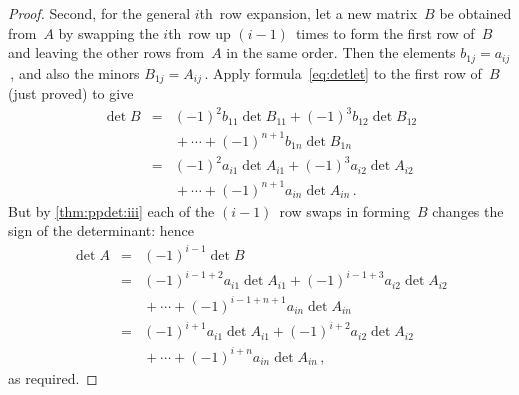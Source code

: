 \begin{proof}
Second, for the general \(i\)th~row expansion, let a new matrix~\(B\) be obtained from~\(A\) by swapping the \(i\)th~row up \((i-1)\)~times to form the first row of~\(B\) and leaving the other rows from~\(A\) in the same order.
Then the elements \(b_{1j}=a_{ij}\)\,, and also the minors \(B_{1j}=A_{ij}\)\,.
Apply formula~\eqref{eq:detlet} to the first row of~\(B\) (just proved) to give
\begin{eqnarray*}
\det B&=&(-1)^2b_{11}\det B_{11}
+(-1)^3b_{12}\det B_{12}
\\&&{}
+\cdots
+(-1)^{n+1}b_{1n}\det B_{1n}
\\&=&(-1)^2a_{i1}\det A_{i1}
+(-1)^3a_{i2}\det A_{i2}
\\&&{}
+\cdots
+(-1)^{n+1}a_{in}\det A_{in}\,.
\end{eqnarray*}
But by \autoref{thm:ppdet:iii} each of the \((i-1)\)~row swaps in forming~\(B\) changes the sign of the determinant: hence
\begin{eqnarray*}
\det A&=&(-1)^{i-1}\det B
\\&=&(-1)^{i-1+2}a_{i1}\det A_{i1}
+(-1)^{i-1+3}a_{i2}\det A_{i2}
\\&&{}
+\cdots
+(-1)^{i-1+n+1}a_{in}\det A_{in}
\\&=&(-1)^{i+1}a_{i1}\det A_{i1}
+(-1)^{i+2}a_{i2}\det A_{i2}
\\&&{}
+\cdots
+(-1)^{i+n}a_{in}\det A_{in}\,,
\end{eqnarray*}
as required.
\end{proof}



